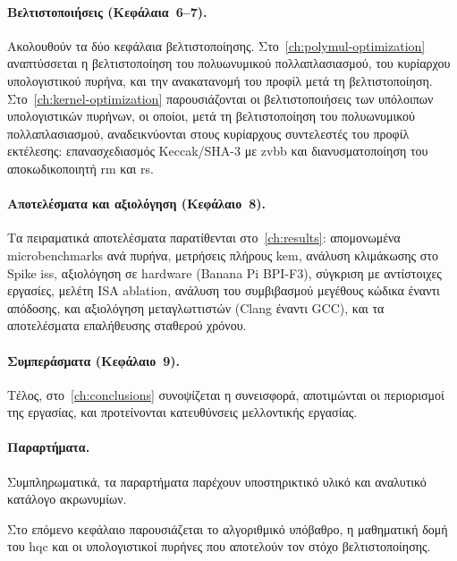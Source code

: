 \paragraph{Βελτιστοποιήσεις (Κεφάλαια~6–7).}
Ακολουθούν τα δύο κεφάλαια βελτιστοποίησης. Στο~\cref{ch:polymul-optimization}
αναπτύσσεται η βελτιστοποίηση του πολυωνυμικού πολλαπλασιασμού, του κυρίαρχου
υπολογιστικού πυρήνα, και την ανακατανομή του προφίλ μετά τη βελτιστοποίηση.
Στο~\cref{ch:kernel-optimization} παρουσιάζονται οι βελτιστοποιήσεις των υπόλοιπων υπολογιστικών πυρήνων, οι οποίοι, μετά τη βελτιστοποίηση του πολυωνυμικού πολλαπλασιασμού, αναδεικνύονται στους κυρίαρχους συντελεστές του προφίλ εκτέλεσης: επανασχεδιασμός Keccak/SHA-3 με \gls{zvbb} και διανυσματοποίηση του αποκωδικοποιητή \gls{rm} και \gls{rs}.

\paragraph{Αποτελέσματα και αξιολόγηση (Κεφάλαιο~8).}
Τα πειραματικά αποτελέσματα παρατίθενται στο~\cref{ch:results}: απομονωμένα
microbenchmarks ανά πυρήνα, μετρήσεις πλήρους \gls{kem}, ανάλυση κλιμάκωσης
\VLEN στο Spike \gls{iss}, αξιολόγηση σε hardware (Banana Pi BPI-F3), 
σύγκριση με αντίστοιχες εργασίες\ifTODO,
μελέτη ISA ablation, ανάλυση του συμβιβασμού μεγέθους κώδικα έναντι απόδοσης\fi, 
και αξιολόγηση μεταγλωττιστών (Clang έναντι GCC)\ifTODO, και τα 
αποτελέσματα επαλήθευσης σταθερού χρόνου\fi.

\paragraph{Συμπεράσματα (Κεφάλαιο~9).}
Τέλος, στο~\cref{ch:conclusions} συνοψίζεται η συνεισφορά, αποτιμώνται οι
περιορισμοί της εργασίας, και προτείνονται κατευθύνσεις μελλοντικής εργασίας.

\paragraph{Παραρτήματα.}
Συμπληρωματικά, τα παραρτήματα παρέχουν υποστηρικτικό υλικό και αναλυτικό κατάλογο ακρωνυμίων.

\bigskip

Στο επόμενο κεφάλαιο παρουσιάζεται το αλγοριθμικό υπόβαθρο, η μαθηματική
δομή του \gls{hqc} και οι υπολογιστικοί πυρήνες που αποτελούν τον στόχο
βελτιστοποίησης.
